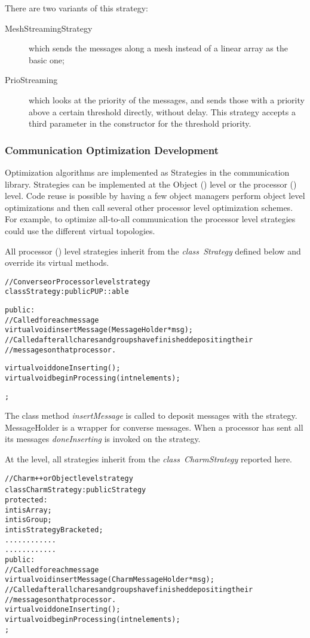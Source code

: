 {There are two variants of this strategy:

\begin{description}
\item[MeshStreamingStrategy] which sends the messages along a mesh instead of a linear array as the basic one;
\item[PrioStreaming] which looks at the priority of the messages, and sends those with a priority above a certain threshold directly, without delay. This strategy accepts a third parameter in the constructor for the threshold priority.
\end{description}


\subsubsection{Communication Optimization Development}

Optimization algorithms are implemented as Strategies in the communication
library. Strategies can be implemented at the Object (\charmpp) level or the
processor (\converse) level. Code reuse is possible by having a few object
managers perform object level optimizations and then call several other
processor level optimization schemes. For example, to optimize all-to-all
communication the processor level strategies could use the different virtual
topologies.

All processor (\converse) level strategies inherit from the {\em class~Strategy}
defined below and override its virtual methods.

\begin{alltt}
// Converse or Processor level strategy
class Strategy : public PUP::able{
public:
    // Called for each message
    virtual void insertMessage(MessageHolder *msg);
    // Called after all chares and groups have finished depositing their
    // messages on that processor.

    virtual void doneInserting();
    virtual void beginProcessing(int nelements);
};
\end{alltt}

The class method {\em insertMessage} is called to deposit messages with the
strategy. MessageHolder is a wrapper for converse messages. When a processor has
sent all its messages {\em doneInserting} is invoked on the strategy.

At the \charmpp{} level, all strategies inherit from the {\em
class~CharmStrategy} reported here.

\begin{alltt}
// Charm++ or Object level strategy
class CharmStrategy : public Strategy{
 protected:
    int isArray;
    int isGroup;
    int isStrategyBracketed;
    ............   
    ............   
public:
    // Called for each message
    virtual void insertMessage(CharmMessageHolder *msg);
    // Called after all chares and groups have finished depositing their
    // messages on that processor.
    virtual void doneInserting();
    virtual void beginProcessing(int nelements);
};
\end{alltt}

}
